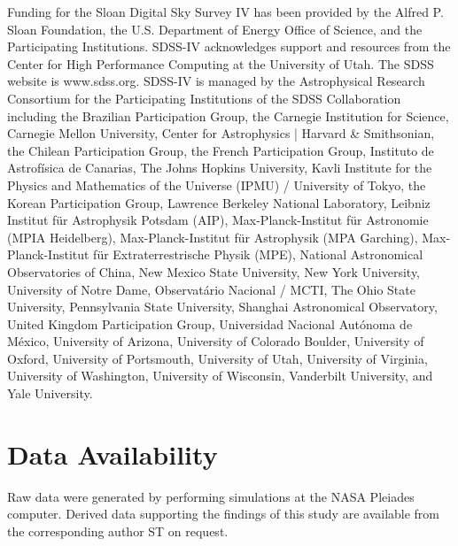 \documentclass[fleqn,usenatbib]{mnras}
\begin{document}
Funding for the Sloan Digital Sky Survey IV has been provided by the Alfred P. Sloan Foundation, the U.S. Department of Energy Office of Science, and the Participating Institutions. SDSS-IV acknowledges support and resources from the Center for High Performance Computing  at the University of Utah. The SDSS website is www.sdss.org. SDSS-IV is managed by the Astrophysical Research Consortium for the Participating Institutions of the SDSS Collaboration including the Brazilian Participation Group, the Carnegie Institution for Science, Carnegie Mellon University, Center for Astrophysics | Harvard \& Smithsonian, the Chilean Participation Group, the French Participation Group, Instituto de Astrof\'isica de Canarias, The Johns Hopkins University, Kavli Institute for the Physics and Mathematics of the Universe (IPMU) / University of Tokyo, the Korean Participation Group, Lawrence Berkeley National Laboratory, Leibniz Institut f\"ur Astrophysik Potsdam (AIP),  Max-Planck-Institut f\"ur Astronomie (MPIA Heidelberg), Max-Planck-Institut f\"ur Astrophysik (MPA Garching), Max-Planck-Institut f\"ur Extraterrestrische Physik (MPE), National Astronomical Observatories of China, New Mexico State University, New York University, University of Notre Dame, Observat\'ario Nacional / MCTI, The Ohio State University, Pennsylvania State University, Shanghai Astronomical Observatory, United Kingdom Participation Group, Universidad Nacional Aut\'onoma de M\'exico, University of Arizona, University of Colorado Boulder, University of Oxford, University of Portsmouth, University of Utah, University of Virginia, University of Washington, University of Wisconsin, Vanderbilt University, and Yale University.


\section*{Data Availability}

Raw data were generated by performing simulations at the NASA Pleiades computer. Derived data supporting the findings of this study are available from the corresponding author ST on request.



\end{document}
